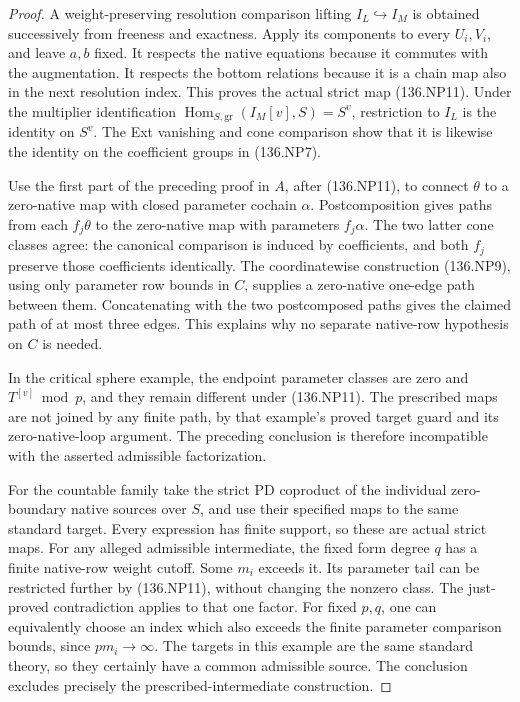\begin{proof}
A weight-preserving resolution comparison lifting
\(I_L\hookrightarrow I_M\) is obtained successively from
freeness and exactness.  Apply its components to every \(U_i,V_i\),
and leave \(a,b\) fixed.  It respects the native equations
because it commutes with the augmentation.  It respects the
bottom relations because it is a chain map also in the next
resolution index.  This proves the actual strict map (136.NP11).
Under the multiplier identification
\(\operatorname{Hom}_{S,\mathrm{gr}}(I_M[v],S)=S^v\),
restriction to \(I_L\) is the identity on \(S^v\).
The Ext vanishing and cone comparison show that it is likewise
the identity on the coefficient groups in (136.NP7).

Use the first part of the preceding proof in \(A\), after
(136.NP11), to connect \(\theta\) to a zero-native map
with closed parameter cochain \(\alpha\).  Postcomposition
gives paths from each \(f_j\theta\) to the zero-native map
with parameters \(f_j\alpha\).  The two latter cone classes
agree: the canonical comparison is induced by coefficients,
and both \(f_j\) preserve those coefficients identically.
The coordinatewise construction (136.NP9), using only parameter
row bounds in \(C\), supplies a zero-native one-edge path
between them.  Concatenating with the two postcomposed paths
gives the claimed path of at most three edges.  This explains
why no separate native-row hypothesis on \(C\) is needed.

In the critical sphere example, the endpoint parameter classes
are zero and \(T^{[v]}\bmod p\), and they remain different
under (136.NP11).  The prescribed maps are not joined by any
finite path, by that example's proved target guard and its
zero-native-loop argument.  The preceding conclusion is therefore
incompatible with the asserted admissible factorization.

For the countable family take the strict PD coproduct of the
individual zero-boundary native sources over \(S\), and
use their specified maps to the same standard target.  Every
expression has finite support, so these are actual strict maps.
For any alleged admissible intermediate, the fixed form degree
\(q\) has a finite native-row weight cutoff.  Some \(m_i\)
exceeds it.  Its parameter tail can be restricted further by
(136.NP11), without changing the nonzero class.  The just-proved
contradiction applies to that one factor.  For fixed \(p,q\),
one can equivalently choose an index which also exceeds the
finite parameter comparison bounds, since \(pm_i\to\infty\).
The targets in this example are the same standard theory, so
they certainly have a common admissible source.  The conclusion
excludes precisely the prescribed-intermediate construction.
\end{proof}


